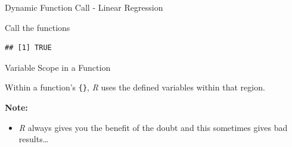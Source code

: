 \begin{frame}[fragile]{Dynamic Function Call - Linear Regression}

Call the functions

\begin{Shaded}
\begin{Highlighting}[]
\StringTok{ }
\StringTok{ }
\StringTok{ }
\StringTok{ }

\end{Highlighting}
\end{Shaded}

\begin{verbatim}
## [1] TRUE
\end{verbatim}

\end{frame}

\begin{frame}[fragile]{Variable Scope in a Function}

Within a function's \texttt{\{\}}, \emph{R} uses the defined variables
within that region.

\begin{Shaded}
\begin{Highlighting}[]
\StringTok{ }
  \StringTok{ }
\NormalTok{\}}

\NormalTok{(}\NormalTok{)}
\end{Highlighting}
\end{Shaded}

\textbf{Note:}

\begin{itemize}
\tightlist
\item
  \emph{R} always gives you the benefit of the doubt and this sometimes
  gives bad results\ldots{}
\end{itemize}

\end{frame}

